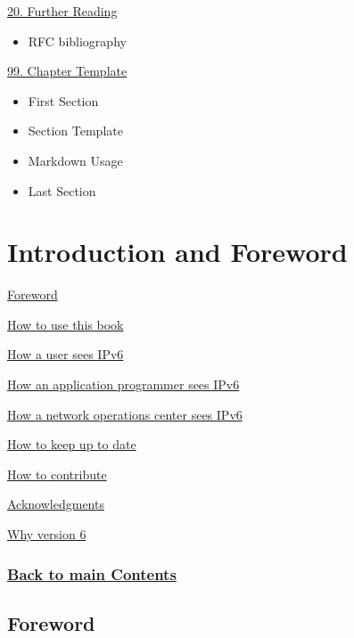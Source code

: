 \documentclass[
]{article}
\providecommand{\tightlist}{%
  \setlength{\itemsep}{0pt}\setlength{\parskip}{0pt}}
\begin{document}
\hyperref[further-reading]{20. Further Reading}

\begin{itemize}
\tightlist
\item
  RFC bibliography
\end{itemize}

\hyperref[chapter-template]{99. Chapter Template}

\begin{itemize}
\tightlist
\item
  First Section
\item
  Section Template
\item
  Markdown Usage
\item
  Last Section
\end{itemize}

\pagebreak

\section{Introduction and Foreword}\label{introduction-and-foreword}

\hyperref[foreword]{Foreword}

\hyperref[how-to-use-this-book]{How to use this book}

\hyperref[how-a-user-sees-ipv6]{How a user sees IPv6}

\hyperref[how-an-application-programmer-sees-ipv6]{How an application
programmer sees IPv6}

\hyperref[how-a-network-operations-center-sees-ipv6]{How a network
operations center sees IPv6}

\hyperref[how-to-keep-up-to-date]{How to keep up to date}

\hyperref[how-to-contribute]{How to contribute}

\hyperref[acknowledgments]{Acknowledgments}

\hyperref[why-version-6]{Why version 6}

\subsubsection{\texorpdfstring{\hyperref[list-of-contents]{Back to main
Contents}}{Back to main Contents}}\label{back-to-main-contents}

\pagebreak

\subsection{Foreword}\label{foreword}
\end{document}

